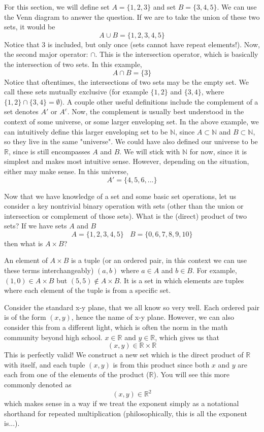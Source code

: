 For this section, we will define set $A = \{ 1, 2, 3\}$ and set $B = \{ 3, 4, 5\}$. We can use the Venn diagram to answer the question. If we are to take the union of these two sets, it would be \[A \cup B = \{ 1, 2, 3, 4, 5\}\]Notice that 3 is included, but only once (sets cannot have repeat elements!). Now, the second major operator: $\cap$. This is the intersection operator, which is basically the intersection of two sets. In this example, \[A \cap B = \{3\}\]Notice that oftentimes, the intersections of two sets may be the empty set. We call these sets mutually exclusive (for example $\{ 1, 2\}$ and $\{ 3, 4\}$, where $\{ 1, 2\} \cap \{ 3, 4\} = \emptyset$). A couple other useful definitions include the complement of a set denotes $A'$ or $ A^c$. Now, the complement is usually best understood in the context of some universe, or some larger enveloping set. In the above example, we can intuitively define this larger enveloping set to be $\mathbb{N}$, since $A \subset \mathbb{N}$ and $B \subset \mathbb{N}$, so they live in the same "universe". We could have also defined our universe to be $\mathbb{R}$, since is still encompasses $A$ and $B$. We will stick with $\mathbb{N}$ for now, since it is simplest and makes most intuitive sense. However, depending on the situation, either may make sense. In this universe, \[A' = \{4, 5, 6, ...\}\]

Now that we have knowledge of a set and some basic set operations, let us consider a key nontrivial binary operation with sets (other than the union or intersection or complement of those sets). What is the (direct) product of two sets? If we have sets $A$ and $B$
\[
A = \{ 1, 2, 3, 4 , 5\} ~~~~ B = \{0, 6, 7, 8, 9, 10 \}
\]
then what is $A \times B$? 

An element of $A \times B$ is a tuple (or an ordered pair, in this context we can use these terms interchangeably) $(a, b)$ where $a \in A$ and $b \in B$. For example, $(1, 0) \in A \times B$ but $(5, 5) \notin A \times B$. It is a set in which elements are tuples where each element of the tuple is from a specific set. 

Consider the standard x-y plane, that we all know so very well. Each ordered pair is of the form $(x, y)$, hence the name of x-y plane. However, we can also consider this from a different light, which is often the norm in the math community beyond high school. $x \in \mathbb{R}$ and $y \in \mathbb{R}$, which gives us that 
\[
(x, y) \in \mathbb{R} \times \mathbb{R}
\]
This is perfectly valid! We construct a new set which is the direct product of $\mathbb{R}$ with itself, and each tuple $(x, y)$ is from this product since both $x$ and $y$ are each from one of the elements of the product ($\mathbb{R}$). You will see this more commonly denoted as
\[
(x, y) \in \mathbb{R}^2
\]
which makes sense in a way if we treat the exponent simply as a notational shorthand for repeated multiplication (philosophically, this is all the exponent is...). 

